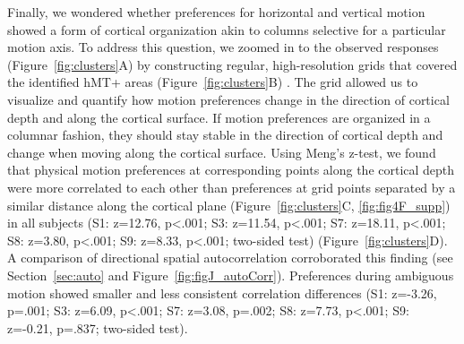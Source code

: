Finally, we wondered whether preferences for horizontal and vertical motion showed a form of cortical organization akin to columns selective for a particular motion axis. To address this question, we zoomed in to the observed responses (Figure~\ref{fig:clusters}A) by constructing regular, high-resolution grids that covered the identified hMT+ areas (Figure~\ref{fig:clusters}B) \parencite{Kemper2017}. The grid allowed us to visualize and quantify how motion preferences change in the direction of cortical depth and along the cortical surface. If motion preferences are organized in a columnar fashion, they should stay stable in the direction of cortical depth and change when moving along the cortical surface. Using Meng's \parencite*{Meng1992} z-test, we found that physical motion preferences at corresponding points along the cortical depth were more correlated to each other than preferences at grid points separated by a similar distance along the cortical plane (Figure~\ref{fig:clusters}C, \ref{fig:fig4F_supp}) \parencite{Nasr2016} in all subjects (S1: z=12.76, p\textless.001; S3: z=11.54, p\textless.001; S7: z=18.11, p\textless.001; S8: z=3.80, p\textless.001; S9: z=8.33, p\textless.001; two-sided test) (Figure~\ref{fig:clusters}D). A comparison of directional spatial autocorrelation corroborated this finding (see Section~\ref{sec:auto} and Figure~\ref{fig:figJ_autoCorr}). Preferences during ambiguous motion showed smaller and less consistent correlation differences (S1: z=-3.26, p=.001; S3: z=6.09, p\textless.001; S7: z=3.08, p=.002; S8: z=7.73, p\textless.001; S9: z=-0.21, p=.837; two-sided test).

